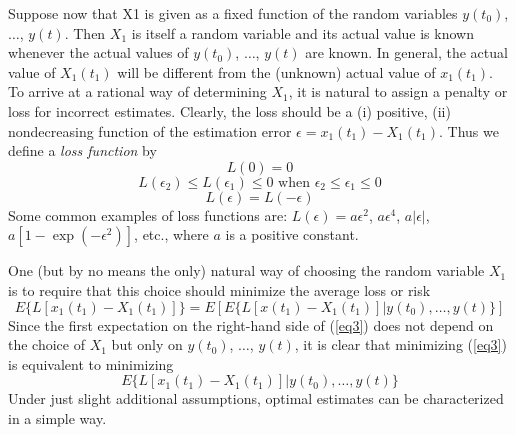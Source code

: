 \documentclass{article}
\begin{document}
Suppose now that X1 is given as a fixed function of the random variables $y(t_0)$, $\dotsc$, $y(t)$. Then $X_1$ is itself a random variable and its actual value is known whenever the actual values of $y(t_0)$, $\dotsc$, $y(t)$ are known. In general, the actual value of $X_1(t_1)$ will be different from the (unknown) actual value of $x_1(t_1)$. To arrive at a rational way of determining $X_1$, it is natural to assign a penalty or loss for incorrect estimates. Clearly, the loss should be a (i) positive, (ii) nondecreasing function of the estimation error $\epsilon = x_1(t_1)-X_1(t_1)$. Thus we define a \emph{loss function} by
\begin{equation*}
L(0)=0
\end{equation*}
\begin{equation}
\label{eq2}
L(\epsilon_2) \le L(\epsilon_1) \le 0 \text{ when } \epsilon_2 \le \epsilon_1 \le 0
\end{equation}
\begin{equation*}
L(\epsilon)=L(-\epsilon) 
\end{equation*}
Some common examples of loss functions are: $L(\epsilon) = a\epsilon^2$, $a\epsilon^4$, $a\vert \epsilon \vert$, $a[1 - \exp(-\epsilon^2)]$, etc., where $a$ is a positive constant.

One (but by no means the only) natural way of choosing the random variable $X_1$ is to require that this choice should minimize the average loss or risk
\begin{equation}
\label{eq3}
E\{L[x_1(t_1)-X_1(t_1)]\}=E[E\{L[x(t_1)-X_1(t_1)] \vert y(t_0), \dotsc, y(t)\}]
\end{equation}
Since the first expectation on the right-hand side of (\ref{eq3}) does not depend on the choice of $X_1$ but only on $y(t_0)$, $\dotsc$, $y(t)$, it is clear that minimizing (\ref{eq3}) is equivalent to minimizing
\begin{equation}
\label{eq4}
E\{L[x_1(t_1)-X_1(t_1)] \vert y(t_0), \dotsc, y(t)\}
\end{equation}
Under just slight additional assumptions, optimal estimates can be characterized in a simple way.
\end{document}
